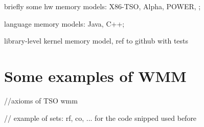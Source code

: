 briefly some hw memory models: X86-TSO, Alpha, POWER, ;

language memory models: Java, C++;

library-level kernel memory model, ref to github with tests



\section{Some examples of WMM}

//axioms of TSO wmm

// example of sets: rf, co, ... for the code snipped used before

